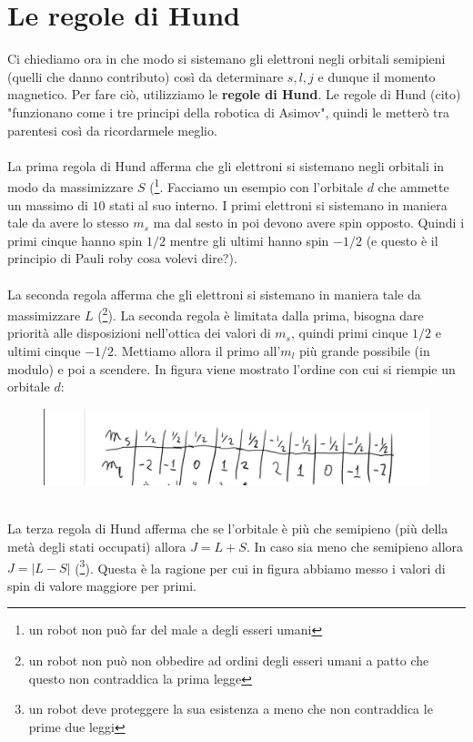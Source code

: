 \documentclass{book}
\begin{document}
     \section{Le regole di Hund}
     Ci chiediamo ora in che modo si sistemano gli elettroni negli orbitali semipieni (quelli che danno contributo) così da determinare $s, l, j$ e dunque il momento magnetico. Per fare ciò, utilizziamo le \textbf{regole di Hund}. Le regole di Hund (cito) "funzionano come i tre principi della robotica di Asimov", quindi le metterò tra parentesi così da ricordarmele meglio.\\ \\ 
     La prima regola di Hund afferma che gli elettroni si sistemano negli orbitali in modo da massimizzare $S$ (\footnote{un robot non può far del male a degli esseri umani}. Facciamo un esempio con l'orbitale $d$ che ammette un massimo di $10$ stati al suo interno. I primi elettroni si sistemano in maniera tale da avere lo stesso $m_{s}$ ma dal sesto in poi devono avere spin opposto. Quindi i primi cinque hanno spin $1/2$ mentre gli ultimi hanno spin $-1/2$ (e questo è il principio di Pauli roby cosa volevi dire?). \\ \\
     La seconda regola afferma che gli elettroni si sistemano in maniera tale da massimizzare $L$ (\footnote{un robot non può non obbedire ad ordini degli esseri umani a patto che questo non contraddica la prima legge}). La seconda regola è limitata dalla prima, bisogna dare priorità alle disposizioni nell'ottica dei valori di $m_{s}$, quindi primi cinque $1/2$ e ultimi cinque $-1/2$. Mettiamo allora il primo all'$m_{l}$ più grande possibile (in modulo) e poi a scendere. In figura viene mostrato l'ordine con cui si riempie un orbitale $d$:
     \begin{figure}[h!]
         \centering
         \includegraphics[width=0.75\linewidth]{img/Lez28img1.png}
     \end{figure} \\
     La terza regola di Hund afferma che se l'orbitale è più che semipieno (più della metà degli stati occupati) allora $J = L+S$. In caso sia meno che semipieno allora $J=|L-S|$ (\footnote{un robot deve proteggere la sua esistenza a meno che non contraddica le prime due leggi}). Questa è la ragione per cui in figura abbiamo messo i valori di spin di valore maggiore per primi.\\
\end{document}
